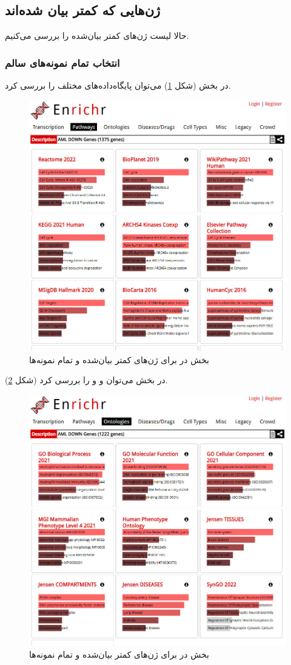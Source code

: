 \documentclass{article}
\begin{document}
\subsection{ژن‌هایی که کمتر بیان شده‌اند}
حالا لیست ژن‌های کمتر بیان‌شده را بررسی می‌کنیم.

\subsubsection{انتخاب تمام نمونه‌های سالم}
در بخش  (شکل \ref{fig:enrichr-pathways-d}) می‌توان پایگاه‌داده‌های  مختلف را بررسی کرد.
\begin{figure}[h!]
	\centering
	\includegraphics[width=0.5\columnwidth]{figs/enrichr-pathways-d.jpg}
	\caption{بخش  در  برای ژن‌های کمتر بیان‌شده و تمام نمونه‌ها}
	\label{fig:enrichr-pathways-d}
\end{figure}

در بخش  می‌توان  و  و  را بررسی کرد (شکل \ref{fig:enrichr-ontology-d}).
\begin{figure}[h!]
	\centering
	\includegraphics[width=0.5\columnwidth]{figs/enrichr-ontologies-d-2.jpg}
	\caption{بخش  در  برای ژن‌های کمتر بیان‌شده و تمام نمونه‌ها}
	\label{fig:enrichr-ontology-d}
\end{figure}
\end{document}
